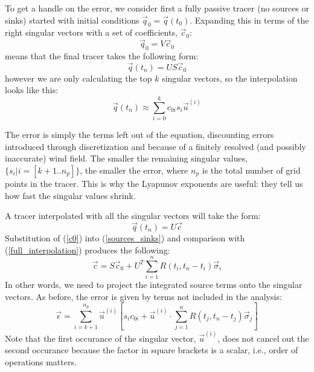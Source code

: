 \documentclass{article}
\begin{document}
To get a handle on the error, we consider first a fully passive tracer 
(no sources or sinks) started with initial conditions $\vec q_0=\vec q(t_0)$.
Expanding this in terms of the right singular vectors with a set
of coefficients, $\vec c_0$:
\begin{equation}
	\vec q_0 = V \vec c_0
	\label{c0}
\end{equation}
means that the final tracer takes the following form:
\begin{equation}
	\vec q(t_n) = U S \vec c_0
\end{equation}
however we are only calculating the top $k$ singular vectors, so the
interpolation looks like this:
\begin{equation}
	\vec q(t_n) \approx \sum_{i=0}^k c_{0i} s_i \vec u^{(i)}
\end{equation}

The error is simply the terms left out of the equation,
discounting errors introduced through discretization and because of
a finitely resolved (and possibly inaccurate) wind field.
The smaller the remaining singular values, $\lbrace s_i|i=[k+1..n_p]\rbrace$,
the smaller the error, where $n_p$ is the total number of grid points in the tracer.
This is why the Lyapunov exponents are useful:
they tell us how fast the singular values shrink.

A tracer interpolated with all the singular vectors will take the form:
\begin{equation}
	\vec q(t_n) = U \vec c
	\label{full_interpolation}
\end{equation}
Substitution of (\ref{c0}) into (\ref{sources_sinks}) and comparison with
(\ref{full_interpolation}) produces
the following:
\begin{equation}
	\vec c = S \vec c_0 + U^T \sum_{i=1}^n R(t_i, t_n-t_i) \vec \sigma_i
\end{equation}
In other words, we need to project the integrated source terms onto the
singular vectors.
As before, the error is given by terms not included in the analysis:
\begin{equation}
	\vec \epsilon = \sum_{i=k+1}^{n_p} \vec u^{(i)} \left [s_i c_{0i}
	+ \vec u^{(i)} \cdot \sum_{j=1}^n R(t_j, t_n-t_j) \vec \sigma_j \right ]
	\label{error1}
\end{equation}
Note that the first occurance of the singular vector, $\vec u^(i)$, does not
cancel out the second occurance because the factor in square brackets is a scalar, i.e., order of operations matters.
\end{document}
